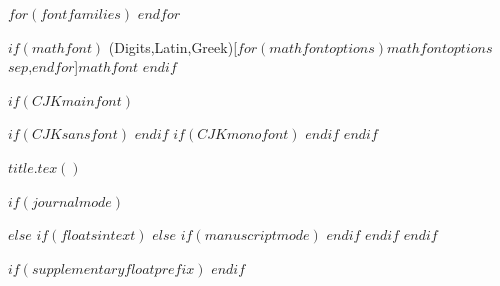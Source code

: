 $for(fontfamilies)$
  \setmonofont[$for(monofontoptions)$$monofontoptions$$sep$,$endfor$$if(monofontfallback)$,RawFeature={fallback=monofontfallback}$endif$]{$monofont$}
$endfor$

$if(mathfont)$
\setmathfont(Digits,Latin,Greek)[$for(mathfontoptions)$$mathfontoptions$$sep$,$endfor$]{$mathfont$}
$endif$

$if(CJKmainfont)$
    \usepackage{xeCJK}
    $if(CJKsansfont)$
    $endif$
    $if(CJKmonofont)$
    $endif$
$endif$

$title.tex()$

$if(journalmode)$
\usepackage{pbalance}
\makeatletter
\let\oldtpt\ThreePartTable
\let\endoldtpt\endThreePartTable
\def\ThreePartTable{\@ifnextchar[\ThreePartTable@i \ThreePartTable@ii}
\def\ThreePartTable@i[#1]{\begin{figure}[!htbp]
\onecolumn
\begin{minipage}{0.485\textwidth}
\oldtpt[#1]
}
\def\ThreePartTable@ii{\begin{figure}[!htbp]
\onecolumn
\begin{minipage}{0.48\textwidth}
\oldtpt
}
\def\endThreePartTable{
\endoldtpt
\end{minipage}
\twocolumn
\end{figure}}
\makeatother


\makeatletter
\let\endoldlt\endlongtable		
\def\endlongtable{
\hline
\endoldlt}
\makeatother

\newenvironment{twocolumntable}%
{%
\begin{table}[!htbp]%
\onecolumn%
}%
{%
\twocolumn%
\end{table}%
}%
$else$
\makeatletter
\let\endoldlt\endlongtable
\def\endlongtable{
\hline
\endoldlt
}
\makeatother
$if(floatsintext)$
$else$
$if(manuscriptmode)$
\RequirePackage{longtable}
$endif$
$endif$
$endif$


$if(supplementaryfloatprefix)$
\renewcommand{\thefigure}{S\arabic{figure}}
\renewcommand{\thetable}{S\arabic{table}}
\makeatletter
\apptocmd{\appendix}
  {\renewcommand{\thefigure}{S\arabic{figure}}\renewcommand{\thetable}{S\arabic{table}}}
  {}{}
\makeatother
$endif$


